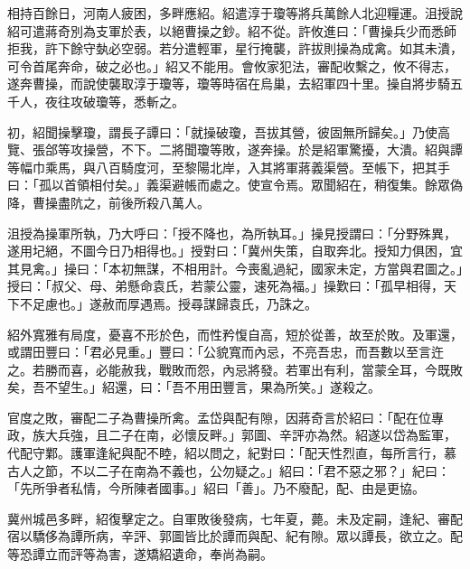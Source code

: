 \begin{pinyinscope}
相持百餘日，河南人疲困，多畔應紹。紹遣淳于瓊等將兵萬餘人北迎糧運。沮授說紹可遣蔣奇別為支軍於表，以絕曹操之鈔。紹不從。許攸進曰：「曹操兵少而悉師拒我，許下餘守埶必空弱。若分遣輕軍，星行掩襲，許拔則操為成禽。如其未潰，可令首尾奔命，破之必也。」紹又不能用。會攸家犯法，審配收繫之，攸不得志，遂奔曹操，而說使襲取淳于瓊等，瓊等時宿在烏巢，去紹軍四十里。操自將步騎五千人，夜往攻破瓊等，悉斬之。

初，紹聞操擊瓊，謂長子譚曰：「就操破瓊，吾拔其營，彼固無所歸矣。」乃使高覽、張郃等攻操營，不下。二將聞瓊等敗，遂奔操。於是紹軍驚擾，大潰。紹與譚等幅巾乘馬，與八百騎度河，至黎陽北岸，入其將軍蔣義渠營。至帳下，把其手曰：「孤以首領相付矣。」義渠避帳而處之。使宣令焉。眾聞紹在，稍復集。餘眾偽降，曹操盡阬之，前後所殺八萬人。

沮授為操軍所執，乃大呼曰：「授不降也，為所執耳。」操見授謂曰：「分野殊異，遂用圮絕，不圖今日乃相得也。」授對曰：「冀州失策，自取奔北。授知力俱困，宜其見禽。」操曰：「本初無謀，不相用計。今喪亂過紀，國家未定，方當與君圖之。」授曰：「叔父、母、弟懸命袁氏，若蒙公靈，速死為福。」操歎曰：「孤早相得，天下不足慮也。」遂赦而厚遇焉。授尋謀歸袁氏，乃誅之。

紹外寬雅有局度，憂喜不形於色，而性矜愎自高，短於從善，故至於敗。及軍還，或謂田豐曰：「君必見重。」豐曰：「公貌寬而內忌，不亮吾忠，而吾數以至言迕之。若勝而喜，必能赦我，戰敗而怨，內忌將發。若軍出有利，當蒙全耳，今既敗矣，吾不望生。」紹還，曰：「吾不用田豐言，果為所笑。」遂殺之。

官度之敗，審配二子為曹操所禽。孟岱與配有隙，因蔣奇言於紹曰：「配在位專政，族大兵強，且二子在南，必懷反畔。」郭圖、辛評亦為然。紹遂以岱為監軍，代配守鄴。護軍逢紀與配不睦，紹以問之，紀對曰：「配天性烈直，每所言行，慕古人之節，不以二子在南為不義也，公勿疑之。」紹曰：「君不惡之邪？」紀曰：「先所爭者私情，今所陳者國事。」紹曰「善」。乃不廢配，配、由是更協。

冀州城邑多畔，紹復擊定之。自軍敗後發病，七年夏，薨。未及定嗣，逢紀、審配宿以驕侈為譚所病，辛評、郭圖皆比於譚而與配、紀有隙。眾以譚長，欲立之。配等恐譚立而評等為害，遂矯紹遺命，奉尚為嗣。


\end{pinyinscope}